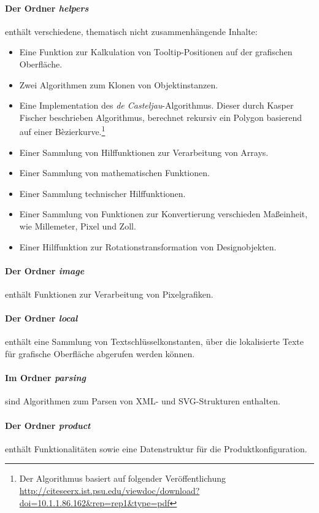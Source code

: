 \paragraph{Der Ordner \emph{helpers}} enthält verschiedene, thematisch nicht zusammenhängende Inhalte:
\begin{itemize}
    \item Eine Funktion zur Kalkulation von Tooltip-Positionen auf der grafischen Oberfläche.
    \item Zwei Algorithmen zum Klonen von Objektinstanzen.
    \item Eine Implementation des \emph{de Casteljau}-Algorithmus. Dieser durch Kasper Fischer beschrieben Algorithmus, berechnet rekursiv ein Polygon basierend auf einer Bèzierkurve.\footnote{Der Algorithmus basiert auf folgender Veröffentlichung \url{http://citeseerx.ist.psu.edu/viewdoc/download?doi=10.1.1.86.162&rep=rep1&type=pdf}}
    \item Einer Sammlung von Hilffunktionen zur Verarbeitung von Arrays.
    \item Einer Sammlung von mathematischen Funktionen.
    \item Einer Sammlung technischer Hilffunktionen.
    \item Einer Sammlung von Funktionen zur Konvertierung verschieden Maßeinheit, wie Millemeter, Pixel und Zoll.
    \item Einer Hilffunktion zur Rotationstransformation von Designobjekten.
\end{itemize}

\paragraph{Der Ordner \emph{image}} enthält Funktionen zur Verarbeitung von Pixelgrafiken.  

\paragraph{Der Ordner \emph{local}} enthält eine Sammlung von Textschlüsselkonstanten, über die lokalisierte Texte für grafische Oberfläche abgerufen werden können.  

\paragraph{Im Ordner \emph{parsing}} sind Algorithmen zum Parsen von XML- und SVG-Strukturen enthalten.

\paragraph{Der Ordner \emph{product}} enthält Funktionalitäten sowie eine Datenstruktur für die Produktkonfiguration.   

